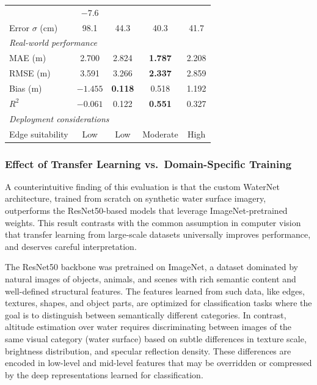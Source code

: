 \begin{table}[htbp]
\begin{center}
\begin{tabular}{|l|c|c|c|c|}
            & $-7.6$ \\
        Error $\sigma$ (cm)
            & 98.1
            & 44.3
            & 40.3
            & 41.7 \\
        \hline
        \multicolumn{5}{|l|}{\textit{Real-world performance}} \\
        \hline
        MAE (m)
            & 2.700
            & 2.824
            & \textbf{1.787}
            & 2.208 \\
        RMSE (m)
            & 3.591
            & 3.266
            & \textbf{2.337}
            & 2.859 \\
        Bias (m)
            & $-1.455$
            & \textbf{0.118}
            & 0.518
            & 1.192 \\
        $R^2$
            & $-0.061$
            & 0.122
            & \textbf{0.551}
            & 0.327 \\
        \hline
        \multicolumn{5}{|l|}{\textit{Deployment considerations}} \\
        \hline
        Edge suitability
            & Low
            & Low
            & Moderate
            & High \\
        \hline
        \end{tabular}
    \label{tab:model_comparison}
    \end{center}
\end{table}

\subsubsection{Effect of Transfer Learning vs.\ Domain-Specific Training}

A counterintuitive finding of this evaluation is that the custom WaterNet architecture, trained from scratch on synthetic water surface imagery, outperforms the ResNet50-based models that leverage ImageNet-pretrained weights. This result contrasts with the common assumption in computer vision that transfer learning from large-scale datasets universally improves performance, and deserves careful interpretation.

The ResNet50 backbone was pretrained on ImageNet, a dataset dominated by natural images of objects, animals, and scenes with rich semantic content and well-defined structural features. The features learned from such data, like edges, textures, shapes, and object parts, are optimized for classification tasks where the goal is to distinguish between semantically different categories. In contrast, altitude estimation over water requires discriminating between images of the same visual category (water surface) based on subtle differences in texture scale, brightness distribution, and specular reflection density. These differences are encoded in low-level and mid-level features that may be overridden or compressed by the deep representations learned for classification.

